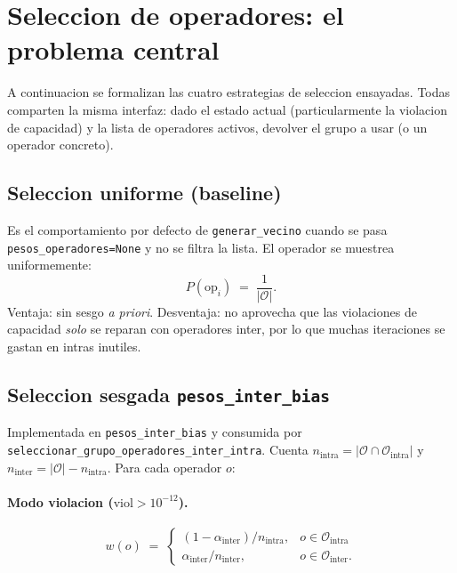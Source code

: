 \documentclass[11pt,a4paper]{article}
\newcommand{\code}[1]{\texttt{#1}}
\begin{document}
\section{Seleccion de operadores: el problema central}\label{sec:seleccion}

A continuacion se formalizan las cuatro estrategias de seleccion
ensayadas. Todas comparten la misma interfaz: dado el estado actual
(particularmente la violacion de capacidad) y la lista de operadores
activos, devolver el grupo a usar (o un operador concreto).

\subsection{Seleccion uniforme (baseline)}

Es el comportamiento por defecto de \code{generar\_vecino} cuando se
pasa \code{pesos\_operadores=None} y no se filtra la lista. El
operador se muestrea uniformemente:
\begin{equation}
P(\text{op}_i) \;=\; \frac{1}{|\mathcal{O}|}.
\end{equation}
Ventaja: sin sesgo \emph{a priori}. Desventaja: no aprovecha que las
violaciones de capacidad \emph{solo} se reparan con operadores inter,
por lo que muchas iteraciones se gastan en intras inutiles.

\subsection{Seleccion sesgada \texttt{pesos\_inter\_bias}}

Implementada en \code{pesos\_inter\_bias} y consumida por
\code{seleccionar\_grupo\_operadores\_inter\_intra}. Cuenta
$n_{\text{intra}}=|\mathcal{O}\cap\mathcal{O}_{\text{intra}}|$ y
$n_{\text{inter}}=|\mathcal{O}|-n_{\text{intra}}$. Para cada operador
$o$:

\paragraph{Modo violacion ($\text{viol}>10^{-12}$).}
\begin{equation}
w(o) \;=\;
\begin{cases}
(1-\alpha_{\text{inter}})/n_{\text{intra}}, & o\in\mathcal{O}_{\text{intra}}\\
\alpha_{\text{inter}}/n_{\text{inter}}, & o\in\mathcal{O}_{\text{inter}}.
\end{cases}
\end{equation}
\end{document}
